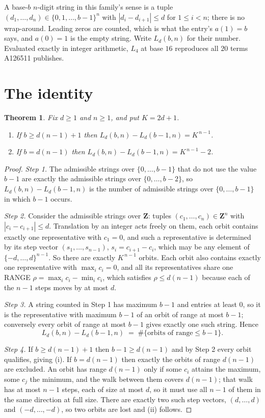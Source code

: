 \documentclass[11pt,a4paper]{article}
\theoremstyle{plain}
\newtheorem{theorem}{Theorem}
\theoremstyle{definition}
\begin{document}
A base-$b$ $n$-digit string in this family's sense is a tuple
$(d_1,\dots,d_n)\in\{0,1,\dots,b-1\}^{n}$ with $|d_i-d_{i+1}|\le d$ for $1\le i<n$; there
is no wrap-around. Leading zeros are counted, which is what the entry's $a(1)=b$ says, and
$a(0)=1$ is the empty string. Write $L_d(b,n)$ for their number. Evaluated exactly in integer
arithmetic, $L_{4}$ at base $16$ reproduces all $20$ terms A126511 publishes.

\section{The identity}

\begin{theorem}
Fix $d\ge1$ and $n\ge1$, and put $K=2d+1$.
\begin{enumerate}
\item[(i)] If $b\ge d(n-1)+1$ then $L_d(b,n)-L_d(b-1,n)=K^{\,n-1}$.
\item[(ii)] If $b=d(n-1)$ then $L_d(b,n)-L_d(b-1,n)=K^{\,n-1}-2$.
\end{enumerate}
\end{theorem}

\begin{proof}
\emph{Step 1.} The admissible strings over $\{0,\dots,b-1\}$ that do not use the value $b-1$
are exactly the admissible strings over $\{0,\dots,b-2\}$, so $L_d(b,n)-L_d(b-1,n)$ is the
number of admissible strings over $\{0,\dots,b-1\}$ in which $b-1$ occurs.

\emph{Step 2.} Consider the admissible strings over $\mathbf{Z}$: tuples
$(c_1,\dots,c_n)\in\mathbf{Z}^{n}$ with $|c_i-c_{i+1}|\le d$. Translation by an integer acts
freely on them, each orbit contains exactly one representative with $c_1=0$, and such a
representative is determined by its step vector $(s_1,\dots,s_{n-1})$, $s_i=c_{i+1}-c_i$,
which may be any element of $\{-d,\dots,d\}^{n-1}$. So there are exactly $K^{\,n-1}$ orbits.
Each orbit also contains exactly one representative with $\max_i c_i=0$, and all its
representatives share one RANGE $\rho=\max_ic_i-\min_ic_i$, which satisfies
$\rho\le d(n-1)$ because each of the $n-1$ steps moves by at most $d$.

\emph{Step 3.} A string counted in Step 1 has maximum $b-1$ and entries at least $0$, so it is
the representative with maximum $b-1$ of an orbit of range at most $b-1$; conversely every orbit
of range at most $b-1$ gives exactly one such string. Hence
\[
L_d(b,n)-L_d(b-1,n)\;=\;\#\{\text{orbits of range}\le b-1\} .
\]

\emph{Step 4.} If $b\ge d(n-1)+1$ then $b-1\ge d(n-1)$ and by Step 2 every orbit qualifies,
giving (i). If $b=d(n-1)$ then exactly the orbits of range $d(n-1)$ are excluded. An orbit has
range $d(n-1)$ only if some $c_i$ attains the maximum, some $c_j$ the minimum, and the walk
between them covers $d(n-1)$; that walk has at most $n-1$ steps, each of size at most $d$, so it
must use all $n-1$ of them in the same direction at full size. There are exactly two such step
vectors, $(d,\dots,d)$ and $(-d,\dots,-d)$, so two orbits are lost and (ii) follows.
\end{proof}
\end{document}
